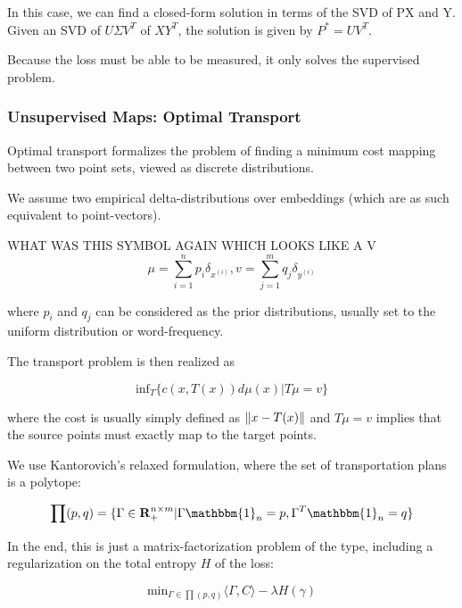 \documentclass[a4paper,12pt,twoside,openright]{report}
\begin{document}
In this case, we can find a closed-form solution in terms of the SVD of PX and Y.
Given an SVD of $U \Sigma V^T$ of $XY^T$, the solution is given by $P^* = UV^T$.

Because the loss must be able to be measured, it only solves the supervised problem.


\subsubsection{Unsupervised Maps: Optimal Transport}

Optimal transport formalizes the problem of finding a minimum cost mapping between two point sets, viewed as discrete distributions.

We assume two empirical delta-distributions over embeddings (which are as such equivalent to point-vectors).

WHAT WAS THIS SYMBOL AGAIN WHICH LOOKS LIKE A V
\begin{equation}
\mu = \sum_{i=1}^n p_i \delta_{x^(i)}, v = \sum_{j=1}^m q_j \delta_{y^(i)}
\end{equation}

where $p_i$ and $q_j$ can be considered as the prior distributions, usually set to the uniform distribution or word-frequency.

The transport problem is then realized as 

\begin{equation}
\text{inf}_T  \lbrace c(x, T(x)) d \mu(x) | T \mu = v \rbrace
\end{equation}

where the cost is usually simply defined as $\left\lVert x - T(x)\right\rVert$ and $T \mu = v$ implies that the source points must exactly map to the target points.

We use Kantorovich's relaxed formulation, where the set of transportation plans is a polytope:

\begin{equation}
\prod(p, q) = \lbrace \Gamma \in \mathbf{R}_+^{n \times m} | \Gamma \mathbbm{1}_n = p, \Gamma^T \mathbbm{1}_n = q \rbrace
\end{equation}

In the end, this is just a matrix-factorization problem of the type, including a regularization on the total entropy $H$ of the loss:

\begin{equation}
\text{min}_{\Gamma \in \prod(p, q)} \langle \Gamma, C \rangle - \lambda H(\gamma)
\end{equation}
\end{document}
